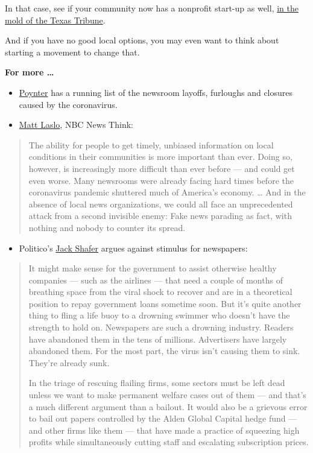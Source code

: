 In that case, see if your community now has a nonprofit start-up as
well,
\href{https://www.nytimes.com/2019/12/10/opinion/local-news.html}{in the
mold of the Texas Tribune}.

And if you have no good local options, you may even want to think about
starting a movement to change that.

\textbf{For more \ldots{}}

\begin{itemize}
\item
  \href{https://www.poynter.org/business-work/2020/here-are-the-newsroom-layoffs-furloughs-and-closures-caused-by-the-coronavirus/}{Poynter}
  has a running list of the newsroom layoffs, furloughs and closures
  caused by the coronavirus.
\item
  \href{https://www.nbcnews.com/think/opinion/coronavirus-revealing-why-local-news-so-important-it-s-also-ncna1186261}{Matt
  Laslo}, NBC News Think:
\end{itemize}

\begin{quote}
The ability for people to get timely, unbiased information on local
conditions in their communities is more important than ever. Doing so,
however, is increasingly more difficult than ever before --- and could
get even worse. Many newsrooms were already facing hard times before the
coronavirus pandemic shuttered much of America's economy. \ldots{} And
in the absence of local news organizations, we could all face an
unprecedented attack from a second invisible enemy: Fake news parading
as fact, with nothing and nobody to counter its spread.
\end{quote}

\begin{itemize}
\tightlist
\item
  Politico's
  \href{https://www.politico.com/news/magazine/2020/04/20/dont-waste-stimulus-money-on-newspapers-197015}{Jack
  Shafer} argues against stimulus for newspapers:
\end{itemize}

\begin{quote}
It might make sense for the government to assist otherwise healthy
companies --- such as the airlines --- that need a couple of months of
breathing space from the viral shock to recover and are in a theoretical
position to repay government loans sometime soon. But it's quite another
thing to fling a life buoy to a drowning swimmer who doesn't have the
strength to hold on. Newspapers are such a drowning industry. Readers
have abandoned them in the tens of millions. Advertisers have largely
abandoned them. For the most part, the virus isn't causing them to sink.
They're already sunk.

In the triage of rescuing flailing firms, some sectors must be left dead
unless we want to make permanent welfare cases out of them --- and
that's a much different argument than a bailout. It would also be a
grievous error to bail out papers controlled by the Alden Global Capital
hedge fund --- and other firms like them --- that have made a practice
of squeezing high profits while simultaneously cutting staff and
escalating subscription prices.
\end{quote}

